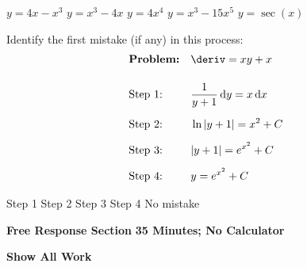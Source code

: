 \begin{questions}
    \begin{oneparchoices}
        \choice $y = 4x - x^3$
        \choice $y = x^3 - 4x$
        \choice $y = 4x^4$
        \choice $y = x^3 - 15x^5$
        \choice $y = \sec (x)$
    \end{oneparchoices} \par \horizontalline

    \question Identify the first mistake (if any) in this process: \begin{align*}
        & \textbf{Problem:} && \deriv = xy + x\\[11pt]
        & \text{Step 1:} && \dfrac{1}{y + 1} \,\mathrm{d}y = x \,\mathrm{d}x \\[5.5pt]
        & \text{Step 2:} && \ln |y + 1| = x^2 + C \\[5.5pt]
        & \text{Step 3:} && |y + 1| = e^{x^2} + C \\[5.5pt]
        & \text{Step 4:} && y = e^{x^2} + C
    \end{align*}

    \begin{oneparchoices}
        \choice Step 1
        \choice Step 2
        \choice Step 3
        \choice Step 4
        \choice No mistake
    \end{oneparchoices} \par \horizontalline
\end{questions}

\newpage
{}

\textbf{Free Response Section} \hfill \textbf{35 Minutes; No Calculator} \\[11pt]

\begin{center}
    \textbf{Show All Work}
\end{center}
\vspace{11pt}

